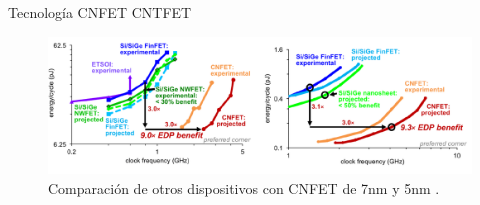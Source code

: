 \documentclass[aspectratio=169, 8pt]{beamer}
\begin{document}
\begin{frame}{Tecnología CNFET CNTFET}
	\begin{figure}[h!]
		\centering
		\includegraphics[width=15cm]{IMAGENES/img14}
		\caption{Comparación de otros dispositivos con CNFET de 7nm y 5nm \cite{UnderstandingEnergyEfficiency2018} .}
		\label{img14}
	\end{figure}
\end{frame}
\end{document}
